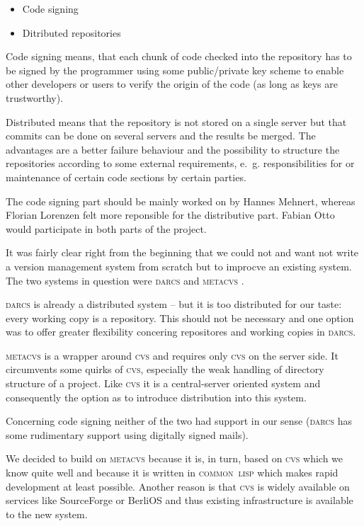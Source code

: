 \documentclass[fleqn, 10pt, a4paper]{report} \usepackage{amssymb}
\begin{document}
\begin{itemize}
\item Code signing
\item Ditributed repositories
\end{itemize}

Code signing means, that each chunk of code checked into the
repository has to be signed by the programmer using some
public/private key scheme to enable other developers or users to
verify the origin of the code (as long as keys are trustworthy).

Distributed means that the repository is not stored on a single server
but that commits can be done on several servers and the results be
merged. The advantages are a better failure behaviour and the
possibility to structure the repositories according to some external
requirements, e.~g. responsibilities for or maintenance of certain
code sections by certain parties.

The code signing part should be mainly worked on by Hannes Mehnert,
whereas Florian Lorenzen felt more reponsible for the distributive
part. Fabian Otto would participate in both parts of the project.

It was fairly clear right from the beginning that we could not and
want not write a version management system from scratch but to
improcve an existing system. The two systems in question were
\textsc{darcs} \cite{Darc06} and \textsc{metacvs} \cite{Mcvs06}.

\textsc{darcs} is already a distributed system -- but it is too
distributed for our taste: every working copy is a repository.  This
should not be necessary and one option was to offer greater
flexibility concering repositores and working copies in
\textsc{darcs}.

\textsc{metacvs} is a wrapper around \textsc{cvs} \cite{Cvs06}
and requires only
\textsc{cvs} on the server side. It circumvents some quirks of
\textsc{cvs}, especially the weak handling of directory structure of a
project. Like \textsc{cvs} it is a central-server oriented system and
consequently the option as to introduce distribution into this system.

Concerning code signing neither of the two had support in our sense
(\textsc{darcs} has some rudimentary support using digitally signed
mails).

We decided to build on \textsc{metacvs} because it is, in turn, based
on \textsc{cvs} which we know quite well and because it is written in
\textsc{common~lisp} which makes rapid development at least possible.
Another reason is that \textsc{cvs} is widely available on services
like SourceForge \cite{Sour06} or BerliOS \cite{Berl06}
and thus existing infrastructure is available to the new system.
\end{document}

